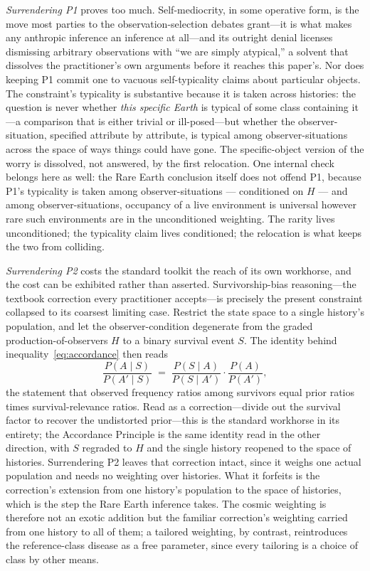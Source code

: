 \emph{Surrendering P1} proves too much. Self-mediocrity, in some operative form, is the move most parties to the observation-selection debates grant---it is what makes any anthropic inference an inference at all---and its outright denial licenses dismissing arbitrary observations with ``we are simply atypical,'' a solvent that dissolves the practitioner's own arguments before it reaches this paper's. Nor does keeping P1 commit one to vacuous self-typicality claims about particular objects. The constraint's typicality is substantive because it is taken across histories: the question is never whether \emph{this specific Earth} is typical of some class containing it---a comparison that is either trivial or ill-posed---but whether the observer-situation, specified attribute by attribute, is typical among observer-situations across the space of ways things could have gone. The specific-object version of the worry is dissolved, not answered, by the first relocation. One internal check belongs here as well: the Rare Earth conclusion itself does not offend P1, because P1's typicality is taken among observer-situations --- conditioned on $H$ --- and among observer-situations, occupancy of a live environment is universal however rare such environments are in the unconditioned weighting. The rarity lives unconditioned; the typicality claim lives conditioned; the relocation is what keeps the two from colliding.

\emph{Surrendering P2} costs the standard toolkit the reach of its own workhorse, and the cost can be exhibited rather than asserted. Survivorship-bias reasoning---the textbook correction every practitioner accepts---is precisely the present constraint collapsed to its coarsest limiting case. Restrict the state space to a single history's population, and let the observer-condition degenerate from the graded production-of-observers $H$ to a binary survival event $S$. The identity behind inequality~\eqref{eq:accordance} then reads
\begin{equation}
\label{eq:survivorship}
\frac{P(A \mid S)}{P(A' \mid S)} \;=\; \frac{P(S \mid A)}{P(S \mid A')} \cdot \frac{P(A)}{P(A')},
\end{equation}
the statement that observed frequency ratios among survivors equal prior ratios times survival-relevance ratios. Read as a correction---divide out the survival factor to recover the undistorted prior---this is the standard workhorse in its entirety; the Accordance Principle is the same identity read in the other direction, with $S$ regraded to $H$ and the single history reopened to the space of histories. Surrendering P2 leaves that correction intact, since it weighs one actual population and needs no weighting over histories. What it forfeits is the correction's extension from one history's population to the space of histories, which is the step the Rare Earth inference takes. The cosmic weighting is therefore not an exotic addition but the familiar correction's weighting carried from one history to all of them; a tailored weighting, by contrast, reintroduces the reference-class disease as a free parameter, since every tailoring is a choice of class by other means.

